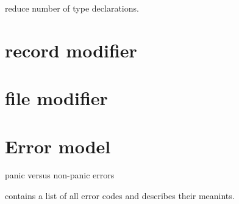  reduce number of type declarations.


\section{record modifier}

\section{file modifier}

\section{Error model}
\label{sec:common-error-model}
 panic versus non-panic errors

 contains a list of all error codes and
describes their meanints.